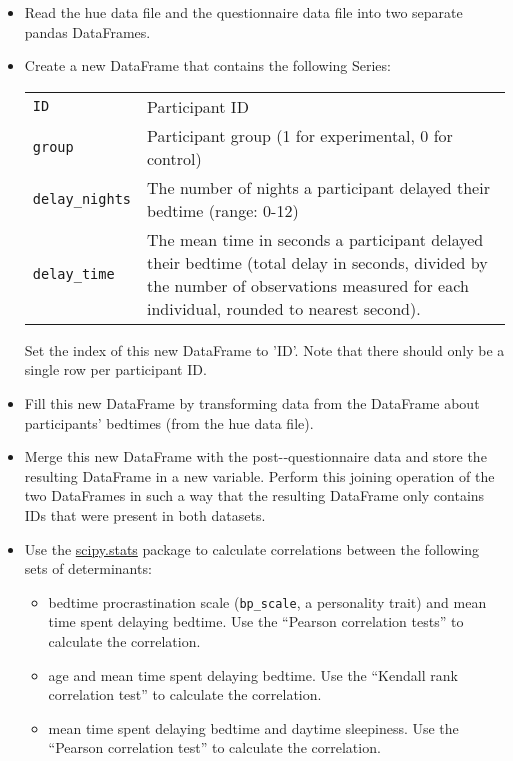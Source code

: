 \documentclass[a4paper]{report}
\theoremstyle{definition}
\begin{document}
	\begin{itemize}
		\item Read the hue data file and the questionnaire data file into two
		separate pandas DataFrames.
		\item Create a new DataFrame that contains the following Series:
		
		\begin{tabular}{| l | p{} |}
			\hline
			\texttt{ID} 			& Participant ID \\
			\texttt{group}			& Participant group (1 for experimental, 0 for control) \\
			\texttt{delay\_nights}	& The number of nights a participant delayed their bedtime (range: 0-12) \\
			\texttt{delay\_time} 	& The mean time in seconds a participant delayed their bedtime (total delay in seconds, divided by the number of observations measured for each individual, rounded to nearest second). \\
			\hline
		\end{tabular}
		
		
		Set the index of this new DataFrame to 'ID'. Note that there should only be a single row per participant ID.
		
		\item Fill this new DataFrame by transforming data from the DataFrame about participants' bedtimes (from the hue data file).
		
		\item Merge this new DataFrame with the post-­‐questionnaire data and store the resulting DataFrame in a new variable. Perform this joining
		operation of the two DataFrames in such a way that the resulting DataFrame only contains IDs that were present in both datasets.
		
		\item Use the \href{http://docs.scipy.org/doc/scipy/reference/stats.html}{scipy.stats} package to calculate correlations between the following sets of determinants:
		\begin{itemize}
			\item bedtime procrastination scale (\texttt{bp\_scale}, a personality trait) and mean time spent delaying bedtime. Use the ``Pearson correlation tests'' to calculate the correlation.
			\item age and mean time spent delaying bedtime. Use the ``Kendall rank correlation test'' to calculate the correlation.
			\item mean time spent delaying bedtime and daytime sleepiness. Use the ``Pearson correlation test'' to calculate the correlation.
		\end{itemize}
		

\end{itemize}
\end{document}

